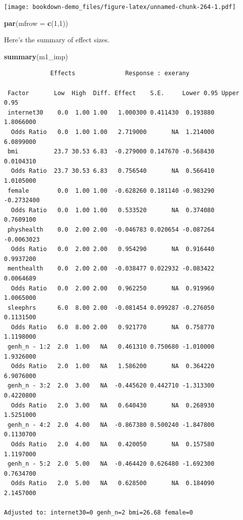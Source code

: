 \documentclass[]{book}
\newenvironment{Shaded}{\begin{snugshade}}{\end{snugshade}}
\newcommand{\KeywordTok}[1]{\textcolor[rgb]{0.13,0.29,0.53}{\textbf{#1}}}
\newcommand{\DataTypeTok}[1]{\textcolor[rgb]{0.13,0.29,0.53}{#1}}
\newcommand{\DecValTok}[1]{\textcolor[rgb]{0.00,0.00,0.81}{#1}}
\newcommand{\NormalTok}[1]{#1}
\theoremstyle{definition}
\theoremstyle{definition}
\theoremstyle{definition}
\theoremstyle{remark}
\begin{document}
\texttt{[image: bookdown-demo\_files/figure-latex/unnamed-chunk-264-1.pdf]}

\begin{Shaded}
\begin{Highlighting}[]
\KeywordTok{par}\NormalTok{(}\DataTypeTok{mfrow =} \KeywordTok{c}\NormalTok{(}\DecValTok{1}\NormalTok{,}\DecValTok{1}\NormalTok{))}
\end{Highlighting}
\end{Shaded}

Here's the summary of effect sizes.

\begin{Shaded}
\begin{Highlighting}[]
\KeywordTok{summary}\NormalTok{(m1_imp)}
\end{Highlighting}
\end{Shaded}

\begin{verbatim}
             Effects              Response : exerany 

 Factor       Low  High  Diff. Effect    S.E.     Lower 0.95 Upper 0.95
 internet30    0.0  1.00 1.00   1.000300 0.411430  0.193880   1.8066000
  Odds Ratio   0.0  1.00 1.00   2.719000       NA  1.214000   6.0899000
 bmi          23.7 30.53 6.83  -0.279000 0.147670 -0.568430   0.0104310
  Odds Ratio  23.7 30.53 6.83   0.756540       NA  0.566410   1.0105000
 female        0.0  1.00 1.00  -0.628260 0.181140 -0.983290  -0.2732400
  Odds Ratio   0.0  1.00 1.00   0.533520       NA  0.374080   0.7609100
 physhealth    0.0  2.00 2.00  -0.046783 0.020654 -0.087264  -0.0063023
  Odds Ratio   0.0  2.00 2.00   0.954290       NA  0.916440   0.9937200
 menthealth    0.0  2.00 2.00  -0.038477 0.022932 -0.083422   0.0064689
  Odds Ratio   0.0  2.00 2.00   0.962250       NA  0.919960   1.0065000
 sleephrs      6.0  8.00 2.00  -0.081454 0.099287 -0.276050   0.1131500
  Odds Ratio   6.0  8.00 2.00   0.921770       NA  0.758770   1.1198000
 genh_n - 1:2  2.0  1.00   NA   0.461310 0.750680 -1.010000   1.9326000
  Odds Ratio   2.0  1.00   NA   1.586200       NA  0.364220   6.9076000
 genh_n - 3:2  2.0  3.00   NA  -0.445620 0.442710 -1.313300   0.4220800
  Odds Ratio   2.0  3.00   NA   0.640430       NA  0.268930   1.5251000
 genh_n - 4:2  2.0  4.00   NA  -0.867380 0.500240 -1.847800   0.1130700
  Odds Ratio   2.0  4.00   NA   0.420050       NA  0.157580   1.1197000
 genh_n - 5:2  2.0  5.00   NA  -0.464420 0.626480 -1.692300   0.7634700
  Odds Ratio   2.0  5.00   NA   0.628500       NA  0.184090   2.1457000

Adjusted to: internet30=0 genh_n=2 bmi=26.68 female=0  
\end{verbatim}
\end{document}
